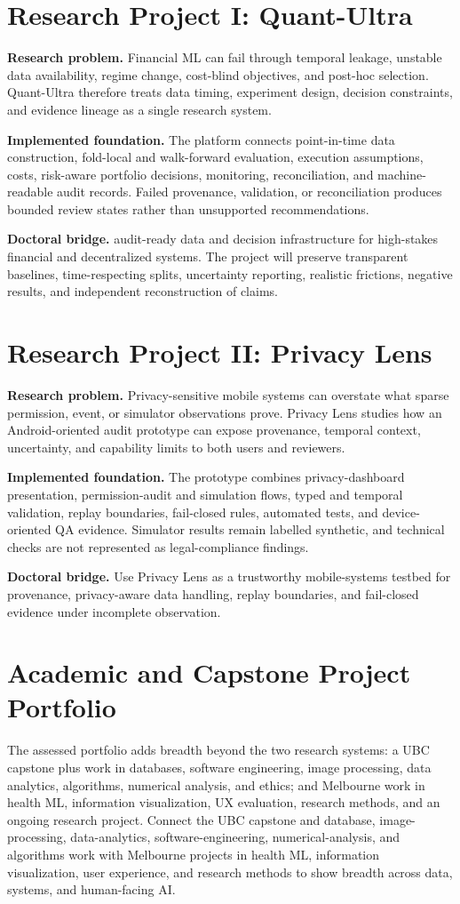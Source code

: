 \documentclass[11pt]{article}
\begin{document}
\section*{Research Project I: Quant-Ultra}
\textbf{Research problem.} Financial ML can fail through temporal leakage, unstable data availability, regime change, cost-blind objectives, and post-hoc selection. Quant-Ultra therefore treats data timing, experiment design, decision constraints, and evidence lineage as a single research system.

\textbf{Implemented foundation.} The platform connects point-in-time data construction, fold-local and walk-forward evaluation, execution assumptions, costs, risk-aware portfolio decisions, monitoring, reconciliation, and machine-readable audit records. Failed provenance, validation, or reconciliation produces bounded review states rather than unsupported recommendations.

\textbf{Doctoral bridge.} audit-ready data and decision infrastructure for high-stakes financial and decentralized systems. The project will preserve transparent baselines, time-respecting splits, uncertainty reporting, realistic frictions, negative results, and independent reconstruction of claims.

\section*{Research Project II: Privacy Lens}
\textbf{Research problem.} Privacy-sensitive mobile systems can overstate what sparse permission, event, or simulator observations prove. Privacy Lens studies how an Android-oriented audit prototype can expose provenance, temporal context, uncertainty, and capability limits to both users and reviewers.

\textbf{Implemented foundation.} The prototype combines privacy-dashboard presentation, permission-audit and simulation flows, typed and temporal validation, replay boundaries, fail-closed rules, automated tests, and device-oriented QA evidence. Simulator results remain labelled synthetic, and technical checks are not represented as legal-compliance findings.

\textbf{Doctoral bridge.} Use Privacy Lens as a trustworthy mobile-systems testbed for provenance, privacy-aware data handling, replay boundaries, and fail-closed evidence under incomplete observation.

\section*{Academic and Capstone Project Portfolio}
The assessed portfolio adds breadth beyond the two research systems: a UBC capstone plus work in databases, software engineering, image processing, data analytics, algorithms, numerical analysis, and ethics; and Melbourne work in health ML, information visualization, UX evaluation, research methods, and an ongoing research project. Connect the UBC capstone and database, image-processing, data-analytics, software-engineering, numerical-analysis, and algorithms work with Melbourne projects in health ML, information visualization, user experience, and research methods to show breadth across data, systems, and human-facing AI.
\end{document}
